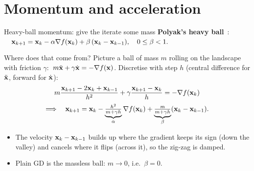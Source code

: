 \section{Momentum and acceleration}

\begin{frame}{Heavy-ball momentum: give the iterate some mass}
  \textbf{Polyak's heavy ball}~\cite{polyak1964}:
  $\quad\mathbf{x}_{k+1} = \mathbf{x}_k - \alpha\nabla f(\mathbf{x}_k) + \beta\,(\mathbf{x}_k-\mathbf{x}_{k-1}),\quad 0\le\beta<1.$

  \vspace{4pt}
  \small Where does that come from? Picture a ball of mass $m$ rolling on the landscape with friction $\gamma$:
  $\;m\ddot{\mathbf{x}}+\gamma\dot{\mathbf{x}} = -\nabla f(\mathbf{x})$. Discretise with step $h$ (central difference for $\ddot{\mathbf{x}}$, forward for $\dot{\mathbf{x}}$):
  \[
    m\frac{\mathbf{x}_{k+1}-2\mathbf{x}_k+\mathbf{x}_{k-1}}{h^2}+\gamma\frac{\mathbf{x}_{k+1}-\mathbf{x}_k}{h} = -\nabla f(\mathbf{x}_k)
  \]
  \[
    \Longrightarrow\quad \mathbf{x}_{k+1} = \mathbf{x}_k - \underbrace{\tfrac{h^2}{m+\gamma h}}_{\alpha}\nabla f(\mathbf{x}_k) + \underbrace{\tfrac{m}{m+\gamma h}}_{\beta}(\mathbf{x}_k-\mathbf{x}_{k-1}).
  \]
  \begin{itemize}\small
    \item The velocity $\mathbf{x}_k-\mathbf{x}_{k-1}$ \alert{builds up} where the gradient keeps its sign (down the valley) and
          \alert{cancels} where it flips (across it), so the zig-zag is damped.
    \item Plain GD is the massless ball: $m\to0$, i.e.\ $\beta = 0$.
  \end{itemize}
\end{frame}

